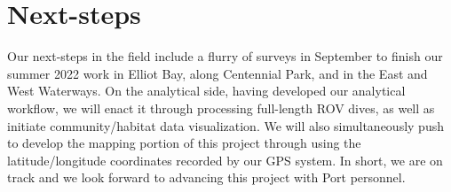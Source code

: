 \documentclass[11pt]{article}
\begin{document}
\section{Next-steps}
Our next-steps in the field include a flurry of surveys in September to 
finish our summer 2022 work in Elliot Bay, along Centennial Park, and in
the East and West Waterways. 
On the analytical side, having developed our analytical workflow, we 
will enact it through processing full-length ROV dives, as well as initiate community/habitat data visualization. 
We will also simultaneously push to develop the mapping portion of this 
project through using the latitude/longitude coordinates recorded by our GPS system. 
In short, we are on track and we look forward to advancing this project with Port personnel.  





\end{document}
